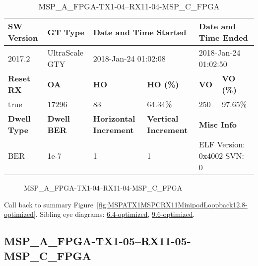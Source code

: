 \begin{table}[h]
\centering
\caption{MSP\_A\_FPGA-TX1-04--RX11-04-MSP\_C\_FPGA}
\label{tab:MSPAFPGATX104RX1104MSPCFPGA12.8-optimized}
\begin{tabular}{@{}|l|l|l|l|l|l|@{}}
\toprule
\textbf{SW Version}                & \textbf{GT Type}   & \multicolumn{2}{l|}{\textbf{Date and Time Started}}            & \multicolumn{2}{l|}{\textbf{Date and Time Ended}}        \\ \midrule
2017.2                       & UltraScale GTY          & \multicolumn{2}{l|}{2018-Jan-24 01:02:08}                   & \multicolumn{2}{l|}{2018-Jan-24 01:02:50}               \\ \midrule
\textbf{Reset RX}                  & \textbf{OA} & \textbf{HO}   & \textbf{HO (\%)} & \textbf{VO} & \textbf{VO (\%)} \\ \midrule
true & 17296        & 83          & 64.34\%        & 250        & 97.65\%       \\ \midrule
\textbf{Dwell Type}                & \textbf{Dwell BER} & \textbf{Horizontal Increment} & \textbf{Vertical Increment}    & \multicolumn{2}{l|}{\textbf{Misc Info}}                  \\ \midrule
BER                            & 1e-7        & 1        & 1           & \multicolumn{2}{l|}{ELF Version: 0x4002 SVN: 0}                         \\ \bottomrule
\end{tabular}
\end{table}

\begin{figure}[h]
\caption{MSP\_A\_FPGA-TX1-04--RX11-04-MSP\_C\_FPGA} \label{fig:MSPAFPGATX104RX1104MSPCFPGA12.8-optimized}
\end{figure}

Call back to summary Figure~\ref{fig:MSPATX1MSPCRX11MinipodLoopback12.8-optimized}.
Sibling eye diagrams: \hyperref[sec:MSPAFPGATX104RX1104MSPCFPGA6.4-optimized]{6.4-optimized}, \hyperref[sec:MSPAFPGATX104RX1104MSPCFPGA9.6-optimized]{9.6-optimized}.

\clearpage
\newpage


\subsection{MSP\_A\_FPGA-TX1-05--RX11-05-MSP\_C\_FPGA}\label{sec:MSPAFPGATX105RX1105MSPCFPGA12.8-optimized}

